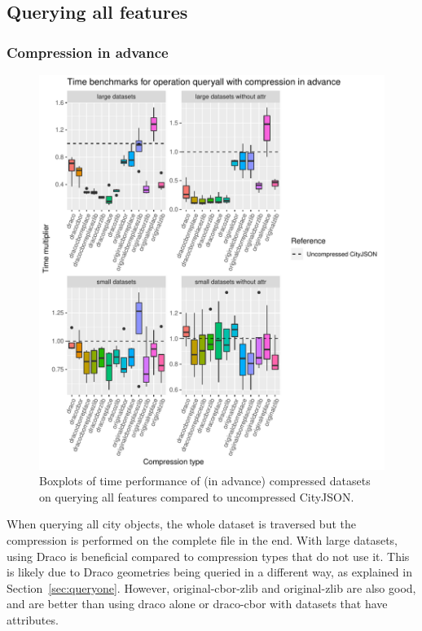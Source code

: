 \subsection{Querying all features}

\subsubsection{Compression in advance}

\begin{figure}[h!]
    \includegraphics[scale=0.92]{figs/benchmark/individual/queryall.pdf}
    \caption{Boxplots of time performance of (in advance) compressed datasets on querying all features compared to uncompressed CityJSON.}
    \label{fig:sdvis}
\end{figure}

When querying all city objects, the whole dataset is traversed but the compression is performed on the complete file in the end.
With large datasets, using Draco is beneficial compared to compression types that do not use it.
This is likely due to Draco geometries being queried in a different way, as explained in Section~\ref{sec:queryone}.
However, original-cbor-zlib and original-zlib are also good, and are better than using draco alone or draco-cbor with datasets that have attributes.

